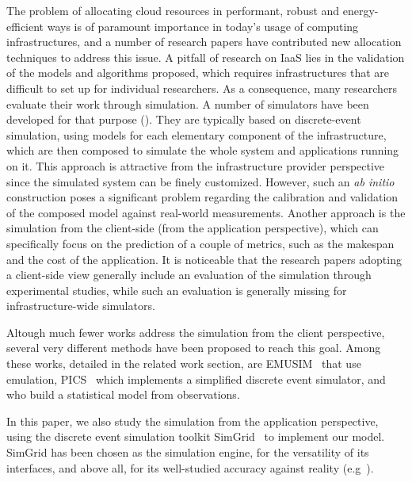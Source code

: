 



The  problem   of  allocating   cloud  resources   in  performant,   robust  and
energy-efficient ways is  of paramount importance in today's  usage of computing
infrastructures, and a number of research papers have contributed new allocation
techniques to  address this issue.   A pitfall of research  on IaaS lies  in the
validation of the models and algorithms proposed, which requires infrastructures
that are difficult to set up for individual researchers.  As a consequence, many
researchers evaluate their work through  simulation. A number of simulators have
been developed  for that purpose  (\cite{CalheirosRBRB11,KliazovichBK12}).  They
are  typically  based  on  discrete-event  simulation,  using  models  for  each
elementary component of the infrastructure,  which are then composed to simulate
the whole  system and applications running  on it.  This approach  is attractive
from the infrastructure  provider perspective since the simulated  system can be
finely customized.   However, such  an \textit{ab  initio} construction  poses a
significant problem  regarding the  calibration and  validation of  the composed
model against real-world measurements.  Another  approach is the simulation from
the client-side (from the application perspective), which can specifically focus
on the prediction of  a couple of metrics, such as the makespan  and the cost of
the  application.   It  is  noticeable  that  the  research  papers  adopting  a
client-side  view generally  include  an evaluation  of  the simulation  through
experimental  studies,  while  such  an  evaluation  is  generally  missing  for
infrastructure-wide simulators.

Altough much  fewer works  address the simulation  from the  client perspective,
several very  different methods have  been proposed  to reach this  goal.  Among
these    works,     detailed    in    the    related     work    section,    are
EMUSIM~\cite{CalheirosNRB13}  that  use   emulation,  PICS~\cite{KimWH15}  which
implements  a simplified  discrete  event  simulator, and~\cite{PucherGWK15}  who
build a statistical model from observations.


In this  paper, we also study  the simulation from the  application perspective,
using  the   discrete  event  simulation  toolkit   SimGrid~\cite{simgrid08}  to
implement our model.  SimGrid has been chosen as the  simulation engine, for the
versatility  of its  interfaces, and  above all,  for its  well-studied accuracy
against reality (e.g~\cite{StanisicTLVM15,VelhoSCL13}).  


